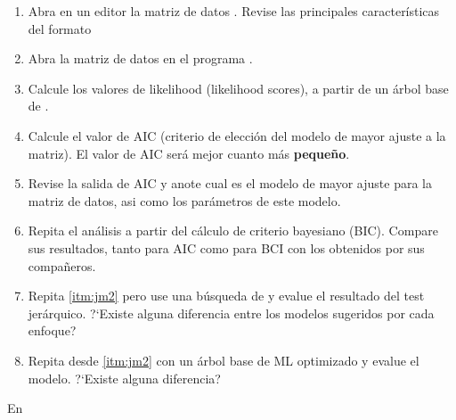\begin{enumerate}
	\item Abra en un editor la matriz de datos . Revise las principales caracter\'isticas del formato 

	\item Abra la matriz de datos en el programa .
	
	\item\label{itm:jm2} Calcule los valores de likelihood (likelihood scores), a partir de un \'arbol base de . 
	
	\item Calcule el valor de AIC (criterio de elecci\'on del modelo de mayor ajuste a la matriz). El valor de AIC ser\'a mejor cuanto m\'as \textbf{peque\~no}.
	
	\item Revise la salida de AIC y anote cual es el modelo de mayor ajuste para la matriz de datos, asi como los par\'ametros de este modelo.
	
	\item Repita el an\'alisis a partir del c\'alculo de criterio bayesiano (BIC). Compare sus resultados, tanto para AIC como para BCI con los obtenidos por sus compa\~neros.

	\item Repita \ref{itm:jm2}  pero use una b\'usqueda de  y evalue el resultado del test jer\'arquico. ?`Existe alguna diferencia entre los modelos sugeridos por cada enfoque? 

	\item Repita desde \ref{itm:jm2} con un \'arbol base de ML optimizado y evalue el modelo. ?`Existe alguna diferencia?
\end{enumerate}



En 


